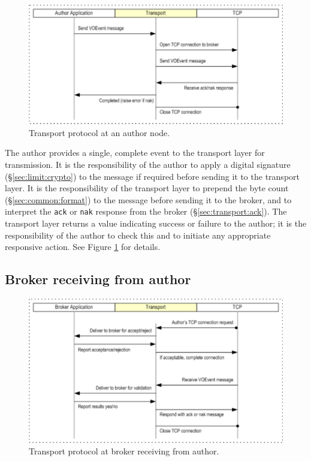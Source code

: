 \documentclass[a4paper,11pt]{ivoa}
\begin{document}
\begin{figure}
  \begin{center}
  \includegraphics{figures/authortobroker.pdf}
  \end{center}

  \caption{Transport protocol at an author node.}

  \label{fig:protocol:authortobroker}
\end{figure}


The author provides a single, complete event to the transport layer for
transmission. It is the responsibility of the author to apply a digital
signature (\S\ref{sec:limit:crypto}) to the message if required before sending
it to the transport layer. It is the responsibility of the transport layer to
prepend the byte count (\S\ref{sec:common:format}) to the message before
sending it to the broker, and to interpret the \texttt{ack} or \texttt{nak}
response from the broker (\S\ref{sec:transport:ack}).  The transport layer
returns a value indicating success or failure to the author; it is the
responsibility of the author to check this and to initiate any appropriate
responsive action. See Figure \ref{fig:protocol:authortobroker} for details.

\subsection{Broker receiving from author}

\begin{figure}
  \begin{center}
  \includegraphics{figures/brokerfromauthor.pdf}
  \end{center}

  \caption{Transport protocol at broker receiving from author.}

  \label{fig:protocol:brokerfromauthor}
\end{figure}
\end{document}
